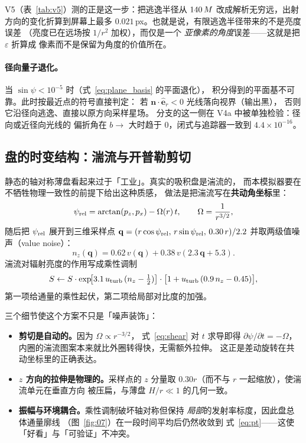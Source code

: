 \noindent
V5（表~\ref{tab:v5}）测的正是这一步：把逃逸半径从 $140\,M$
改成解析无穷远，出射方向的变化折算到屏幕上最多
$0.021$\,px。也就是说，有限逃逸半径带来的不是亮度误差
（亮度已在远场按 $1/r^{2}$ 加权），而仅是一个
\emph{亚像素的角度}误差——这就是把 $\varepsilon$ 折算成
像素而不是保留为角度的价值所在。

\paragraph{径向量子退化。}
当 $\sin\psi<10^{-5}$ 时（式~\eqref{eq:plane_basis} 的平面退化），
积分得到的平面基不可靠。此时按最近点的符号直接判定：
若 $\mathbf{n}\cdot\hat{\mathbf{e}}_r<0$ 光线落向视界（输出黑），
否则它沿径向逃逸、直接以原方向采样星场。
分支的这一侧在 V4a 中被单独检验：径向或近径向光线的
偏折角在 $b\to$ 大时趋于 $0$，闭式与追踪器一致到
$4.4\times10^{-16}$。

\subsection{盘的时变结构：湍流与开普勒剪切}\label{sec:turb}

静态的轴对称薄盘看起来过于「工业」。真实的吸积盘是湍流的，
而本模拟器要在不牺牲物理一致性的前提下给出这种质感，
做法是把湍流写在\textbf{共动角坐标}里：
\begin{equation}
\psi_{\rm rel}=\arctan(p_z,p_x)-\Omega(r)\,t,\qquad
\Omega=\frac{1}{r^{3/2}},
\label{eq:shear}
\end{equation}
随后把 $\psi_{\rm rel}$ 展开到三维采样点
$\mathbf{q}=(r\cos\psi_{\rm rel},\,r\sin\psi_{\rm rel},\,0.30\,r)/2.2$
并取两级值噪声（value noise）：
\begin{equation}
n_z(\mathbf{q})=0.62\,v(\mathbf{q})+0.38\,v(2.3\,\mathbf{q}+\mathbf{5.3}).
\label{eq:fbm}
\end{equation}
湍流对辐射亮度的作用写成乘性调制
\begin{equation}
S\leftarrow S\cdot
\exp\!\bigl[3.1\,u_{\rm turb}\,(n_z-\tfrac12)\bigr]\cdot
\bigl[1+u_{\rm turb}\,(0.9\,n_z-0.45)\bigr],
\label{eq:turbmod}
\end{equation}
第一项给通量的乘性起伏，第二项给局部对比度的加强。

三个细节使这个方案不只是「噪声装饰」：

\begin{itemize}[leftmargin=1.5em,itemsep=2pt,topsep=3pt]
\item \textbf{剪切是自动的。}因为 $\Omega\propto r^{-3/2}$，
      式~\eqref{eq:shear} 对 $t$ 求导即得 $\partial\psi/\partial t=-\Omega$，
      内圈的湍流图案本来就比外圈转得快，无需额外拉伸。
      这正是差动旋转在共动坐标里的正确表达。
\item \textbf{$z$ 方向的拉伸是物理的。}采样点的 $z$ 分量取
      $0.30r$（而不与 $r$ 一起缩放），使湍流单元在垂直方向
      被压扁，与薄盘 $H/r\ll1$ 的几何一致。
\item \textbf{振幅与环境耦合。}乘性调制破坏轴对称但保持
      \emph{局部}的发射率标度，因此盘总体通量廓线
      （图~\ref{fig:07}）在一段时间平均后仍然收敛到
      式~\eqref{eq:pt}——这使「好看」与「可验证」不冲突。
\end{itemize}


